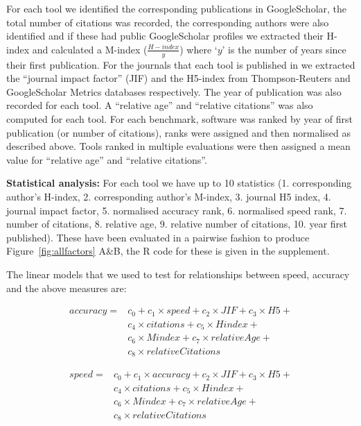 \documentclass[fleqn,10pt]{SelfArx} %
\begin{document}
For each tool we identified the corresponding publications in
GoogleScholar, the total number of citations was recorded, the
corresponding authors were also identified and if these had public
GoogleScholar profiles we extracted their H-index and calculated a
M-index ($\frac{H-index}{y}$) where ‘$y$’ is the number of years since
their first publication. For the journals that each tool is published
in we extracted the “journal impact factor” (JIF) and the H5-index
from Thompson-Reuters and GoogleScholar Metrics databases
respectively. The year of publication was also recorded for each
tool. A “relative age” and “relative citations” was also computed for
each tool. For each benchmark, software was ranked by year of first
publication (or number of citations), ranks were assigned and then
normalised as described above. Tools ranked in multiple evaluations
were then assigned a mean value for “relative age” and “relative
citations”.

\textbf{Statistical analysis:} For each tool we have up to 10
statistics (1. corresponding author’s H-index, 2. corresponding
author’s M-index, 3. journal H5 index, 4. journal impact factor,
5. normalised accuracy rank, 6. normalised speed rank, 7. number of
citations, 8. relative age, 9. relative number of citations, 10. year
first published). These have been evaluated in a pairwise fashion to
produce Figure~\ref{fig:allfactors} A\&B, the R code for these is
given in the supplement.

The linear models that we used to test for relationships between
speed, accuracy and the above measures are:

\begin{equation*}
\begin{split}
accuracy=& c_0+c_1\times speed+c_2\times JIF+c_3\times H5+\\
& c_4\times citations+c_5\times Hindex+\\
& c_6\times Mindex+c_7\times relativeAge+\\
& c_8\times relativeCitations
\end{split}
\end{equation*}

\begin{equation*}
\begin{split}
speed=& c_0+c_{1}\times accuracy+c_{2}\times JIF+c_{3}\times H5+\\
& c_{4}\times citations+c_{5}\times Hindex+\\
& c_{6}\times Mindex+c_{7}\times relativeAge+\\
& c_{8}\times relativeCitations
\end{split}
\end{equation*}
\end{document}
